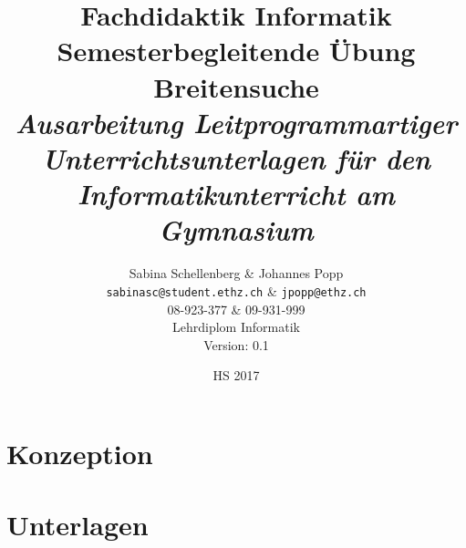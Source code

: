 \documentclass[12pt,a4paper,titlepage]{report}
\theoremstyle{definition}
\begin{document}
\makeatletter\renewcommand{\ALG@name}{Algorithmus}


\title{
\textbf{Fachdidaktik Informatik} \\ 
\vspace{0cm} 
\Large Semesterbegleitende Übung  \\ 
\vspace{4cm} 
\huge \textbf{Breitensuche} \\ 
%
\vspace{1cm} 
\large \emph{Ausarbeitung Leitprogrammartiger Unterrichtsunterlagen für den Informatikunterricht am Gymnasium} 
\vspace{4cm}
}

\author{Sabina Schellenberg \& Johannes Popp \\ \texttt{sabinasc@student.ethz.ch} \& \texttt{jpopp@ethz.ch} \\ 08-923-377 \& 09-931-999 \\ Lehrdiplom Informatik \\ Version: 0.1}
\date{HS 2017}
\maketitle
\tableofcontents
\setcounter{page}{2}


\chapter{Konzeption}






\chapter{Unterlagen}









%



%
\end{document}
